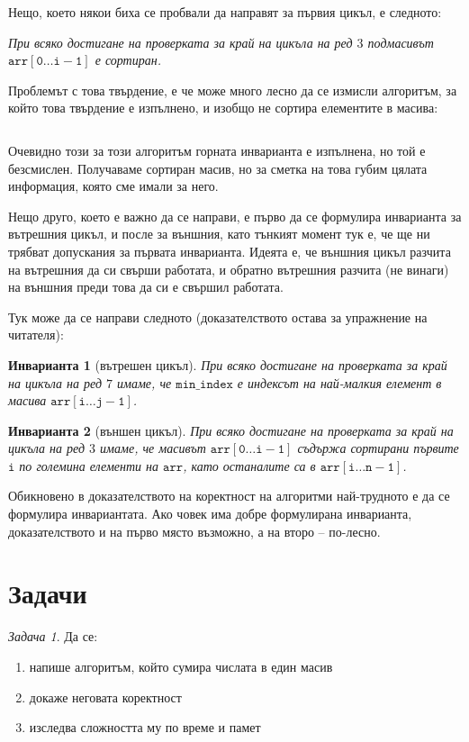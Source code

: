 \documentclass{article}
\theoremstyle{definition}
\theoremstyle{plain}
\newtheorem*{invariant}{Инварианта}
\theoremstyle{remark}
\newtheorem{problem}{Задача}
\theoremstyle{definition}
\begin{document}
Нещо, което някои биха се пробвали да направят за първия цикъл, е следното:
\begin{center}
    \textit{При всяко достигане на проверката за край на цикъла на ред $3$ подмасивът $\mathtt{arr[0 \dots i - 1]}$ е сортиран.}
\end{center}

Проблемът с това твърдение, е че може много лесно да се измисли алгоритъм, за който това твърдение е изпълнено, и изобщо не сортира елементите в масива:
\inputminted[linenos]{c++}{algorithms/trust_me_it_sorts.cpp}

Очевидно този за този алгоритъм горната инварианта е изпълнена, но той е безсмислен.
Получаваме сортиран масив, но за сметка на това губим цялата информация, която сме имали за него.

Нещо друго, което е важно да се направи, е първо да се формулира инварианта за вътрешния цикъл, и после за външния, като тънкият момент тук е, че ще ни трябват допускания за първата инварианта.
Идеята е, че външния цикъл разчита на вътрешния да си свърши работата, и обратно вътрешния разчита (не винаги) на външния преди това да си е свършил работата.

Тук може да се направи следното (доказателството остава за упражнение на читателя):

\begin{invariant}[вътрешен цикъл]
    При всяко достигане на проверката за край на цикъла на ред $7$ имаме, че $\mathtt{min\_index}$ е индексът на най-малкия елемент в масива $\mathtt{arr[i \dots j - 1]}$.
\end{invariant}

\begin{invariant}[външен цикъл]
    При всяко достигане на проверката за край на цикъла на ред $3$ имаме, че масивът $\mathtt{arr[0 \dots i - 1]}$ съдържа сортирани първите $\mathtt{i}$ по големина елементи на $\mathtt{arr}$, като останалите са в $\mathtt{arr[i \dots n - 1]}$.
\end{invariant}

Обикновено в доказателството на коректност на алгоритми най-трудното е да се формулира инвариантата.
Ако човек има добре формулирана инварианта, доказателството и на първо място възможно, а на второ -- по-лесно.

\section*{Задачи}

\begin{problem}
Да се:
\begin{enumerate}
    \item напише алгоритъм, който сумира числата в един масив
    \item докаже неговата коректност
    \item изследва сложността му по време и памет
\end{enumerate}
\end{problem}
\end{document}

